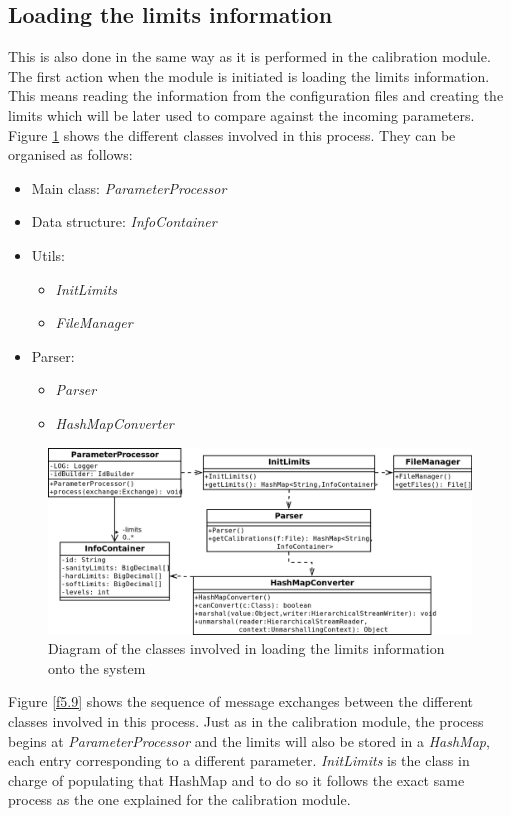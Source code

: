 \subsection{Loading the limits information}
This is also done in the same way as it is performed in the calibration module. The first action when the module is initiated is loading the limits information. This means reading the information from the configuration files and creating the limits which will be later used to compare against the incoming parameters.
Figure \ref{f5.8} shows the different classes involved in this process. They can be organised as follows:
\begin{itemize}
\item Main class: \emph{ParameterProcessor}
\item Data structure: \emph{InfoContainer}
\item Utils:
	\begin{itemize}
		\item \emph{InitLimits}
		\item \emph{FileManager}
	\end{itemize}
\item Parser:
	\begin{itemize}
		\item \emph{Parser}
		\item \emph{HashMapConverter}
	\end{itemize}
\end{itemize}

\begin{figure}[H]
\centerline{\includegraphics[width=1\textwidth]{images/LoadLimitsClassDiagram.png}}
\caption{Diagram of the classes involved in loading the limits information onto the system}
\label{f5.8}
\end{figure}
\pagebreak

Figure \ref{f5.9} shows the sequence of message exchanges between the different classes involved in this process. Just as in the calibration module, the process begins at \emph{ParameterProcessor} and the limits will also be stored in a \emph{HashMap}, each entry corresponding to a different parameter. \emph{InitLimits} is the class in charge of populating that HashMap and to do so it follows the exact same process as the one explained for the calibration module. 




